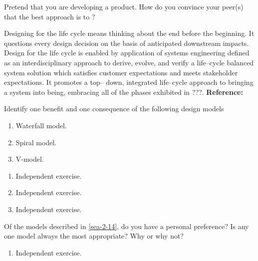 \begin{exercises}
    \begin{exercise}
    \label{sea-2-12}
        Pretend that you are developing a product. How do you convince your peer(s) that the best approach is to ?
    \end{exercise}
    \begin{solution}
        Designing for the life cycle means thinking about the end before the beginning. It questions every design decision on the basis of anticipated downstream impacts. Design for the life cycle is enabled by application of systems engineering defined as an interdisciplinary approach to derive, evolve, and verify a life–cycle balanced system solution which satisfies customer expectations and meets stakeholder expectations. It promotes a top– down, integrated life–cycle approach to bringing a system into being, embracing all of the phases exhibited in ???. \textbf{Reference:}
    \end{solution}
    
    \begin{exercise}
    \label{sea-2-14} 
        Identify one benefit and one consequence of the following design models
        \begin{enumerate}[label=\alph*)]
            \item Waterfall model.
            \item Spiral model.
            \item V-model.
        \end{enumerate}
    \end{exercise}
    \begin{solution}
        \begin{enumerate}[label=\alph*)]
            \item Independent exercise.
            \item Independent exercise.
            \item Independent exercise.
        \end{enumerate}
    \end{solution}
    
    \begin{exercise}
    \label{sea-2-14_part2}
        Of the models described in \ref{sea-2-14}, do you have a personal preference? Is any one model always the most appropriate? Why or why not?
    \end{exercise}
    \begin{solution}
        \begin{enumerate}[label=\alph*)]
            \item Independent exercise.
        \end{enumerate}
    \end{solution}
    

\end{exercises}
